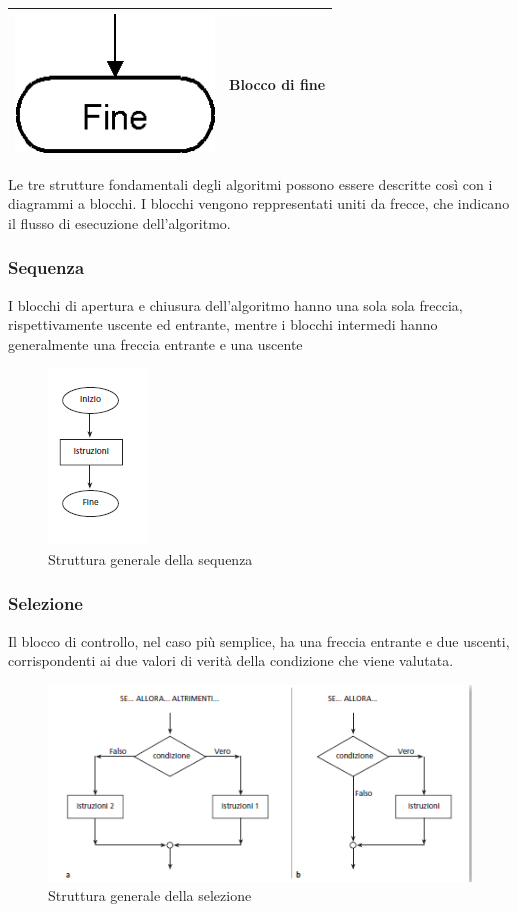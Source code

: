 \documentclass{article}
\begin{document}
\begin{center}
\begin{tabular}{c|c}
			\hline
			\includegraphics[scale=0.5]{Fine.png} & Blocco di fine \\
			\hline
		\end{tabular}
	\end{center}
	Le tre strutture fondamentali degli algoritmi possono essere descritte così con i diagrammi a blocchi. I blocchi vengono reppresentati uniti da frecce, che indicano il flusso di esecuzione dell'algoritmo.
	\subsubsection{Sequenza}
	I blocchi di apertura e chiusura dell’algoritmo hanno una sola sola freccia, rispettivamente uscente ed entrante, mentre i blocchi intermedi hanno generalmente una freccia entrante e una uscente
	\begin{figure}[h!]
		\centering
		\includegraphics[scale=1]{Sequenza.png}
		\caption{Struttura generale della sequenza}
	\end{figure}
	\subsubsection{Selezione}
	Il blocco di controllo, nel caso più semplice, ha una freccia entrante e due uscenti, corrispondenti ai due valori di verità della condizione che viene valutata.
	\begin{figure}[h!]
		\centering
		\includegraphics[scale=1]{Selezione.png}
		\caption{Struttura generale della selezione}
	\end{figure}
\end{document}
